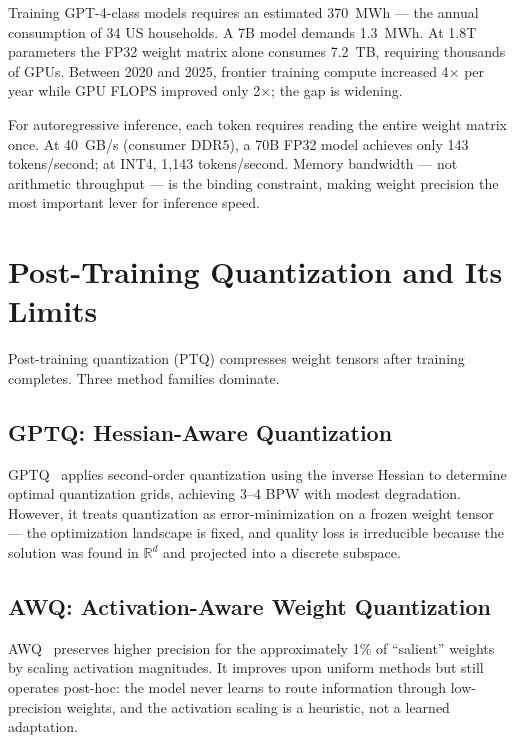 Training GPT-4-class models requires an estimated 370~MWh --- the annual
consumption of 34 US households. A 7B model demands 1.3~MWh. At 1.8T
parameters the FP32 weight matrix alone consumes 7.2~TB, requiring thousands
of GPUs. Between 2020 and 2025, frontier training compute increased 4$\times$
per year while GPU FLOPS improved only 2$\times$; the gap is widening.

For autoregressive inference, each token requires reading the entire weight
matrix once. At 40~GB/s (consumer DDR5), a 70B FP32 model achieves only
143 tokens/second; at INT4, 1{,}143 tokens/second. Memory bandwidth --- not
arithmetic throughput --- is the binding constraint, making weight precision
the most important lever for inference speed.

\section{Post-Training Quantization and Its Limits}
\label{sec:post_training_quantization}

Post-training quantization (PTQ) compresses weight tensors after training
completes. Three method families dominate.

\subsection{GPTQ: Hessian-Aware Quantization}

GPTQ~\cite{frantar2023} applies second-order quantization using the inverse
Hessian to determine optimal quantization grids, achieving 3--4 BPW with
modest degradation. However, it treats quantization as error-minimization on
a frozen weight tensor --- the optimization landscape is fixed, and quality
loss is irreducible because the solution was found in $\mathbb{R}^d$ and
projected into a discrete subspace.

\subsection{AWQ: Activation-Aware Weight Quantization}

AWQ~\cite{ma2023awq} preserves higher precision for the approximately 1\%
of ``salient'' weights by scaling activation magnitudes. It improves upon
uniform methods but still operates post-hoc: the model never learns to route
information through low-precision weights, and the activation scaling is a
heuristic, not a learned adaptation.

